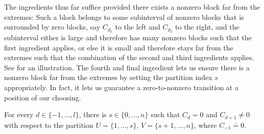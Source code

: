 The ingredients thus far suffice provided there exists a nonzero block far from the extremes:
Such a block belongs to some subinterval of nonzero blocks that is surrounded by zero blocks, say $C_{d_1}$ to the left and $C_{d_2}$ to the right, and the subinterval either is large and therefore has many nonzero blocks such that the first ingredient applies, or else it is small and therefore stays far from the extremes such that the combination of the second
and third ingredients applies. See  for an illustration.
The fourth and final ingredient lets us ensure there is a nonzero block far from the extremes by setting the partition index $s$ appropriately.
In fact, it lets us guarantee a zero-to-nonzero transition at a position of our choosing.

\begin{proposition} \label{prop:ROABP:dselect}
  For every $d \in \{-1,\dots,l\}$, there is $s \in \{0,\dots,n\}$ such that $C_d=0$ and $C_{d+1} \ne 0$
  with respect to the partition \(U=\{1,\ldots,s\}\),
  \(V=\{{s+1},\ldots,n\}\), where $C_{-1} \doteq 0$.
\end{proposition}


